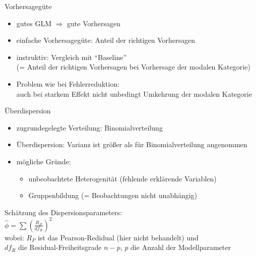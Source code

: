 \begin{frame}
  {Vorhersagegüte}
  \begin{itemize}[<+->]
    \item gutes GLM $\Rightarrow$ gute Vorhersagen
    \item einfache Vorhersagegüte: \alert{Anteil der richtigen Vorhersagen}
    \item instruktiv: \alert{Vergleich mit "`Baseline"'}\\
      (= Anteil der richtigen Vorhersagen bei Vorhersage der modalen Kategorie)
      \vspace{0.5cm}
    \item Problem wie bei Fehlerreduktion:\\
      \alert{auch bei starkem Effekt nicht unbedingt Umkehrung der modalen Kategorie}
  \end{itemize}
\end{frame}

\begin{frame}
  {Überdispersion}
  \begin{itemize}[<+->]
    \item zugrundegelegte Verteilung: \alert{Binomialverteilung}
    \item Überdispersion: Varianz ist größer als für Binomialverteilung angenommen
    \item mögliche Gründe:
      \begin{itemize}[<+->]
	\item unbeobachtete Heterogenität (fehlende erklärende Variablen)
	\item Gruppenbildung (= Beobachtungen nicht unabhängig)
      \end{itemize}
    \end{itemize}
    \pause
    \begin{center}
      Schätzung des \alert{Dispersionsparameters}:\\[3ex]
      \alert{$\hat{\phi}=\sum (\frac{R_P}{df_R})^2$}\\[3ex]
      wobei: \alert{$R_P$ ist das Pearson-Redidual} (hier nicht behandelt) und\\[2ex]
      $df_R$ die \alert{Residual-Freiheitsgrade $n-p$}, $p$ die Anzahl der Modellparameter
    \end{center}
\end{frame}

